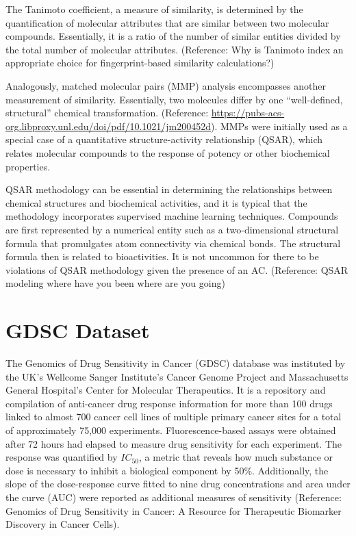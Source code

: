 \documentclass[print]{nuthesis}
\begin{document}
The Tanimoto coefficient, a measure of similarity, is determined by the quantification of molecular attributes that are similar between two molecular compounds. Essentially, it is a ratio of the number of similar entities divided by the total number of molecular attributes. (Reference: Why is Tanimoto index an appropriate choice for fingerprint-based similarity calculations?)

Analogously, matched molecular pairs (MMP) analysis encompasses another measurement of similarity. Essentially, two molecules differ by one ``well-defined, structural'' chemical transformation. (Reference: \url{https://pubs-acs-org.libproxy.unl.edu/doi/pdf/10.1021/jm200452d}). MMPs were initially used as a special case of a quantitative structure-activity relationship (QSAR), which relates molecular compounds to the response of potency or other biochemical properties.

QSAR methodology can be essential in determining the relationships between chemical structures and biochemical activities, and it is typical that the methodology incorporates supervised machine learning techniques. Compounds are first represented by a numerical entity such as a two-dimensional structural formula that promulgates atom connectivity via chemical bonds. The structural formula then is related to bioactivities. It is not uncommon for there to be violations of QSAR methodology given the presence of an AC. (Reference: QSAR modeling where have you been where are you going)

\hypertarget{gdsc-dataset}{%
\section{GDSC Dataset}\label{gdsc-dataset}}

The Genomics of Drug Sensitivity in Cancer (GDSC) database was instituted by the UK's Wellcome Sanger Institute's Cancer Genome Project and Massachusetts General Hospital's Center for Molecular Therapeutics. It is a repository and compilation of anti-cancer drug response information for more than 100 drugs linked to almost 700 cancer cell lines of multiple primary cancer sites for a total of approximately 75,000 experiments. Fluorescence-based assays were obtained after 72 hours had elapsed to measure drug sensitivity for each experiment. The response was quantified by \(IC_\text{50}\), a metric that reveals how much substance or dose is necessary to inhibit a biological component by 50\%. Additionally, the slope of the dose-response curve fitted to nine drug concentrations and area under the curve (AUC) were reported as additional measures of sensitivity (Reference: Genomics of Drug Sensitivity in Cancer: A Resource for Therapeutic Biomarker Discovery in Cancer Cells).
\end{document}
